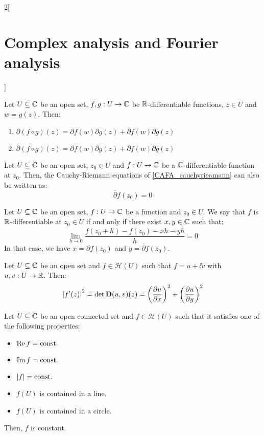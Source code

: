 \documentclass[../../../main.tex]{subfiles}
\begin{document}
\begin{multicols}{2}[\section{Complex analysis and Fourier analysis}]
\begin{proposition}
    Let $U\subseteq \mathbb{C}$ be an open set, $f,g:U\rightarrow \mathbb{C}$ be $\mathbb{R}$-differentiable functions, $z\in U$ and $w=g(z)$. Then:
    \begin{enumerate}
      \item $\partial(f\circ g)(z)=\partial f(w)\partial g(z)+\overline{\partial}f(w)\partial \overline{g}(z)$
      \item $\overline{\partial}(f\circ g)(z)=\partial f(w)\overline{\partial} g(z)+\overline{\partial}f(w)\overline{\partial} \overline{g}(z)$
    \end{enumerate}
  \end{proposition}
  \begin{proposition}
    Let $U\subseteq \mathbb{C}$ be an open set, $z_0\in U$ and $f:U\rightarrow \mathbb{C}$ be a $\mathbb{C}$-differentiable function at $z_0$. Then, the Cauchy-Riemann equations of \cref{CAFA_cauchyrieamann} can also be written as: $$\overline{\partial} f(z_0)=0$$
  \end{proposition}
  \begin{proposition}
    Let $U\subseteq \mathbb{C}$ be an open set, $f:U\rightarrow \mathbb{C}$ be a function and $z_0\in U$. We say that $f$ is $\mathbb{R}$-differentiable at $z_0\in U$ if and only if there exist $x,y\in \mathbb{C}$ such that: $$\lim_{h\to 0}\frac{f(z_0+h)-f(z_0)-xh-y\overline{h}}{h}=0$$
    In that case, we have $x=\partial f(z_0)$ and $y=\overline{\partial} f(z_0)$.
  \end{proposition}
  \begin{proposition}
    Let $U\subseteq \mathbb{C}$ be an open set and $f\in\mathcal{H}(U)$ such that $f=u+\ii v$ with $u,v:U\rightarrow\mathbb{R}$. Then:
    $${|f'(z)|}^2=\det \boldsymbol{\mathrm{D}}(u,v)(z)={\left(\pdv{u}{x}\right)}^2+{\left(\pdv{u}{y}\right)}^2$$
  \end{proposition}
  \begin{proposition}
    Let $U\subseteq \mathbb{C}$ be an open connected set and $f\in\mathcal{H}(U)$ such that it satisfies one of the following properties:
    \begin{itemize}
      \item $\Re f=\text{const.}$
      \item $\Im f=\text{const.}$
      \item $\abs{f}=\text{const.}$
      \item $f(U)$ is contained in a line.
      \item $f(U)$ is contained in a circle.
    \end{itemize}
    Then, $f$ is constant.
  \end{proposition}

\end{multicols}
\end{document}
